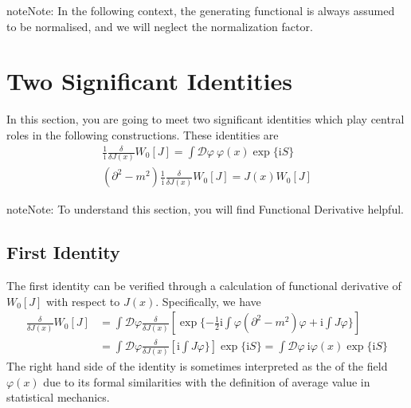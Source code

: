 \documentclass[letterpaper,10pt,english]{sphinxmanual}
\begin{document}
\begin{sphinxadmonition}{note}{Note:}
In the following context, the generating functional is always assumed to be normalised, and we will neglect the normalization factor.
\end{sphinxadmonition}


\section{Two Significant Identities}
\label{\detokenize{qft_ids::doc}}\label{\detokenize{qft_ids:two-significant-identities}}
In this section, you are going to meet two significant identities which play central roles in the following constructions. These identities are
\begin{equation*}
\begin{split}\frac{1}{\mathrm{i}}\frac{\delta}{\delta J(x)}W_0[J] = \int\mathcal{D}\varphi\ \varphi(x)\exp\{\mathrm{i}S\}\\
(\partial^2\!\!-\!m^2)\frac{1}{\mathrm{i}}\frac{\delta}{\delta J(x)}W_0[J] = J(x)W_0[J]\end{split}
\end{equation*}
\begin{sphinxadmonition}{note}{Note:}
To understand this section, you will find Functional Derivative helpful.
\end{sphinxadmonition}


\subsection{First Identity}
\label{\detokenize{qft_ids:first-identity}}
The first identity can be verified through a calculation of functional derivative of \(W_0[J]\) with respect to \(J(x)\). Specifically, we have
\begin{equation*}
\begin{split}\frac{\delta}{\delta J(x)}W_0[J] &= \int\mathcal{D}\varphi\frac{\delta}{\delta J(x)}\left[\exp\{-\frac{1}{2}\mathrm{i}\int\varphi(\partial^2\!\!-\!m^2)\varphi + \mathrm{i}\int J\varphi\}\right]\\
&= \int\mathcal{D}\varphi\frac{\delta}{\delta J(x)}\left[\mathrm{i}\int J\varphi\}\right]\exp\{\mathrm{i}S\} = \int\mathcal{D}\varphi\ \mathrm{i}\varphi(x)\exp\{\mathrm{i}S\}\end{split}
\end{equation*}
The right hand side of the identity is sometimes interpreted as the  of the field \(\varphi(x)\) due to its formal similarities with the definition of average value in statistical mechanics.
\end{document}
